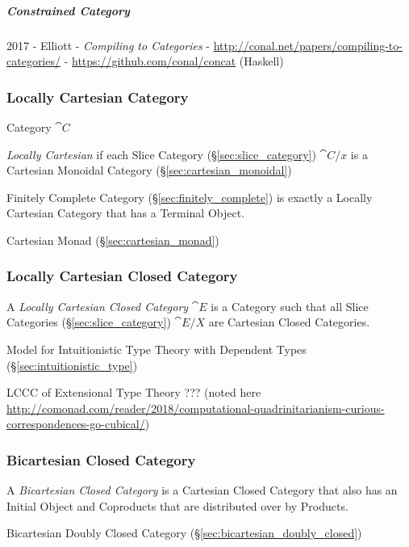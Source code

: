 \subparagraph{Constrained Category}\label{sec:constrained_category}\hfill

2017 - Elliott - \emph{Compiling to Categories} -
\url{http://conal.net/papers/compiling-to-categories/} -
\url{https://github.com/conal/concat} (Haskell)



\subsubsection{Locally Cartesian Category}\label{sec:locally_cartesian}

Category $\cat{C}$

\emph{Locally Cartesian} if each Slice Category
(\S\ref{sec:slice_category}) $\cat{C}/x$ is a Cartesian Monoidal
Category (\S\ref{sec:cartesian_monoidal})

Finitely Complete Category (\S\ref{sec:finitely_complete}) is exactly
a Locally Cartesian Category that has a Terminal Object.

Cartesian Monad (\S\ref{sec:cartesian_monad})



\subsubsection{Locally Cartesian Closed Category}
\label{sec:locally_cartesian_closed}

A \emph{Locally Cartesian Closed Category} $\cat{E}$ is a Category
such that all Slice Categories (\S\ref{sec:slice_category})
$\cat{E}/X$ are Cartesian Closed Categories.

Model for Intuitionistic Type Theory with Dependent Types
(\S\ref{sec:intuitionistic_type})

LCCC of Extensional Type Theory ??? (noted here
\url{http://comonad.com/reader/2018/computational-quadrinitarianism-curious-correspondences-go-cubical/})



\subsubsection{Bicartesian Closed Category}\label{sec:bicartesian}

A \emph{Bicartesian Closed Category} is a Cartesian Closed Category
that also has an Initial Object and Coproducts that are distributed
over by Products.

\fist Bicartesian Doubly Closed Category
(\S\ref{sec:bicartesian_doubly_closed})



